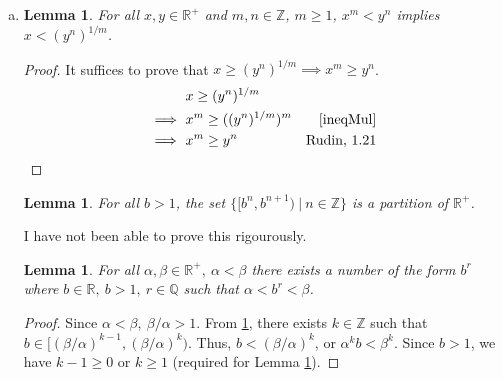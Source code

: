 \documentclass[12pt]{article}
\newtheorem{lemma}[theorem]{Lemma}
\newtheorem{definition}[theorem]{Definition}
\begin{document}
\begin {enumerate} [(a)]
\begin{proof}
      Also, since $r \in \mathbb{R}$ and $r \le r$, $b^r \in B(r)$. Thus, no $b^t < b^r$
      can be an upper bound of $B(r)$.

      $\therefore \ \text{sup}(B(r)) = b^r$.
\end{proof}

\begin{definition}\label{realExpDef}
      $b^x \equiv \sup B(x), x\in \mathbb{R} $.
\end{definition}
\item

\begin{lemma}
      \label{ineqRoot}
      For all $x, y \in \mathbb{R}^+$ and $m, n \in \mathbb{Z}$, $m \ge 1$, $x^m < y^n$ implies
      $x < (y^n)^{1/m}$.
\end{lemma}

\begin{proof}
      It suffices to prove that $x \ge (y^n)^{1/m} \implies x^m \ge y^n$.
      \begin{align*}
                        & x \ge (y^n)^{1/m}                            \\
            \implies \  & x^m \ge ((y^n)^{1/m})^m & \ref{ineqMul}      \\
            \implies \  & x^m \ge y^n             & \text{Rudin, 1.21}
      \end{align*}
\end{proof}
\begin{lemma}
      \label{powerPartition}
      For all $b > 1$, the set $\{[b^n, b^{n+1})\ |\ n \in \mathbb{Z}\}$ is a partition
      of $\mathbb{R}^+$.
\end{lemma}
I have not been able to prove this rigourously.

\begin{lemma}
      \label{densityOfBr}
      For all $\alpha, \beta \in \mathbb{R}^+,\  \alpha < \beta$ there exists a number of the form
      $b^r$ where $b\in \mathbb{R},\  b > 1,\  r\in \mathbb{Q}$ such that
      $\alpha < b^r < \beta$.
\end{lemma}

\begin{proof}
      Since $\alpha < \beta,  \ \beta/\alpha > 1$. From \ref{powerPartition}, there
      exists $k \in \mathbb{Z}$ such that $b \in [(\beta/\alpha)^{k-1}, (\beta/\alpha)^{k})$.
      Thus, $b < (\beta/\alpha)^{k}$, or $\alpha^kb < \beta^k$. Since $b>1$, we have $k-1 \ge 0$
      or $k \ge 1$ (required for Lemma \ref{ineqRoot}).


\end{proof}
\end{enumerate}
\end{document}
